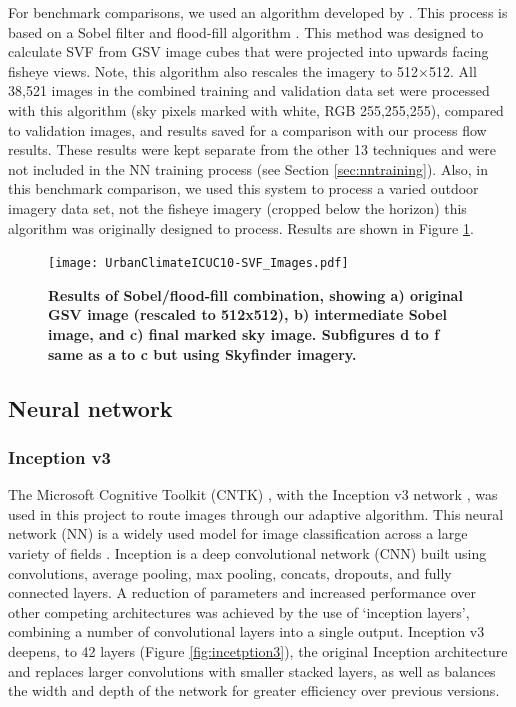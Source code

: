 \documentclass[final,3p,times,authoryear]{elsarticle}
\begin{document}
For benchmark comparisons, we used an algorithm developed by \cite{Middel2018}. This process is based on a Sobel filter \citep{Sobel1968} and flood-fill algorithm \citep{Laungrungthip2008,Middel2017}. This method was designed to calculate SVF from GSV image cubes that were projected into upwards facing fisheye views. Note, this algorithm also rescales the imagery to 512$\times$512. All 38,521 images in the combined training and validation data set were processed with this algorithm (sky pixels marked with white, RGB 255,255,255), compared to validation images, and results saved for a comparison with our process flow results. These results were kept separate from the other 13 techniques and were not included in the NN training process (see Section \ref{sec:nntraining}). Also, in this benchmark comparison, we used this system to process a varied outdoor imagery data set, not the fisheye imagery (cropped below the horizon) this algorithm was originally designed to process. Results are shown in Figure \ref{fig:sobelflood}.



\begin{figure}
\centering 
\texttt{[image: UrbanClimateICUC10-SVF\_Images.pdf]} 
\caption{\bf Results of Sobel/flood-fill combination, showing a) original GSV image (rescaled to 512x512), b) intermediate Sobel image, and c) final marked sky image. Subfigures d to f same as a to c but using Skyfinder imagery.}    
 \label{fig:sobelflood}  
\end{figure} 

\subsection{Neural network}\label{sec:nn}

\subsubsection{Inception v3}\label{sec:inception}
The Microsoft Cognitive Toolkit (CNTK) \citep{Yu2015,Agarwal2016}, with the Inception v3 network \citep{Szegedy2015a}, was used in this project to route images through our adaptive algorithm. This neural network (NN) is a widely used model for image classification across a large variety of fields \citep{Xia2017,Hassannejad2016}. Inception is a deep convolutional network (CNN) built using convolutions, average pooling, max pooling, concats, dropouts, and fully connected layers. A reduction of parameters and increased performance over other competing architectures was achieved by the use of `inception layers', combining a number of convolutional layers into a single output. Inception v3 deepens, to 42 layers (Figure \ref{fig:incetption3}), the original Inception architecture and replaces larger convolutions with smaller stacked layers, as well as balances the width and depth of the network for greater efficiency over previous versions.
\end{document}
